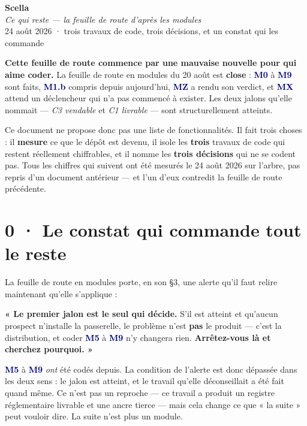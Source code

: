 \documentclass[10pt]{article}
\newcommand{\mm}[1]{\textbf{\textcolor{navy}{#1}}}
\begin{document}
\begin{center}
{\Huge\bfseries\color{navy} Scella}\\[4pt]
{\large\color{grey}\itshape Ce qui reste --- la feuille de route d'après les modules}\\[4pt]
{\small\color{grey} 24 août 2026 \; · \; trois travaux de code, trois décisions, et un constat qui les commande}
\end{center}
\vspace{2pt}

\begin{these}
\textbf{Cette feuille de route commence par une mauvaise nouvelle pour qui aime coder.} La feuille
de route en modules du 20 août est \textbf{close} : \mm{M0} à \mm{M9} sont faits, \mm{M1.b} compris
depuis aujourd'hui, \mm{MZ} a rendu son verdict, et \mm{MX} attend un déclencheur qui n'a pas
commencé à exister. Les deux jalons qu'elle nommait --- \emph{C3 vendable} et \emph{C1 livrable} ---
sont structurellement atteints.

Ce document ne propose donc pas une liste de fonctionnalités. Il fait trois choses : il
\textbf{mesure} ce que le dépôt est devenu, il isole les \textbf{trois} travaux de code qui
restent réellement chiffrables, et il nomme les \textbf{trois décisions} qui ne se codent pas. Tous
les chiffres qui suivent ont été mesurés le 24 août 2026 sur l'arbre, pas repris d'un document
antérieur --- et l'un d'eux contredit la feuille de route précédente.
\end{these}

\section{0 · Le constat qui commande tout le reste}

La feuille de route en modules porte, en son §3, une alerte qu'il faut relire maintenant qu'elle
s'applique :

\begin{alerte}
\textbf{« Le premier jalon est le seul qui décide.} S'il est atteint et qu'aucun prospect n'installe
la passerelle, le problème n'est \textbf{pas} le produit --- c'est la distribution, et coder \mm{M5}
à \mm{M9} n'y changera rien. \textbf{Arrêtez-vous là et cherchez pourquoi. »}
\end{alerte}

\mm{M5} à \mm{M9} \emph{ont} été codés depuis. La condition de l'alerte est donc dépassée dans les
deux sens : le jalon est atteint, et le travail qu'elle déconseillait a été fait quand même. Ce
n'est pas un reproche --- ce travail a produit un registre réglementaire livrable et une ancre
tierce --- mais cela change ce que « la suite » peut vouloir dire. La suite n'est plus un module.
\end{document}
